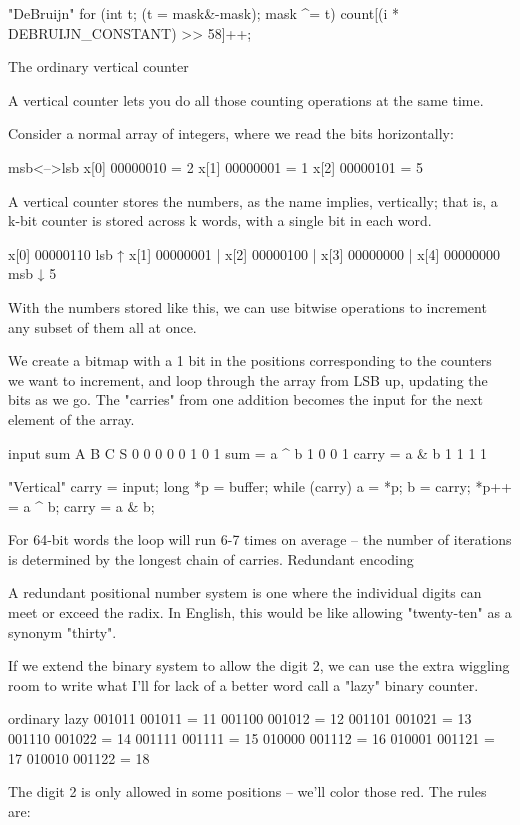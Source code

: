{{{{{{"DeBruijn"
  for (int t; (t = mask&-mask); mask ^= t)
    count[(i * DEBRUIJN_CONSTANT) >> 58]++;

The ordinary vertical counter

A vertical counter lets you do all those counting operations at the same time.

Consider a normal array of integers, where we read the bits horizontally:

       msb<-->lsb
  x[0]  00000010  = 2
  x[1]  00000001  = 1
  x[2]  00000101  = 5

A vertical counter stores the numbers, as the name implies, vertically; that is, a k-bit counter is stored across k words, with a single bit in each word.

  x[0]  00000110   lsb ↑
  x[1]  00000001       |
  x[2]  00000100       |
  x[3]  00000000       |
  x[4]  00000000   msb ↓
             5

With the numbers stored like this, we can use bitwise operations to increment any subset of them all at once.

We create a bitmap with a 1 bit in the positions corresponding to the counters we want to increment, and loop through the array from LSB up, updating the bits as we go. The "carries" from one addition becomes the input for the next element of the array.

  input  sum
   A B   C S
   0 0   0 0
   0 1   0 1      sum    = a ^ b
   1 0   0 1      carry  = a & b
   1 1   1 1

"Vertical"
  carry = input;
  long *p = buffer;
  while (carry) {
    a = *p; b = carry;
    *p++ = a ^ b;
    carry = a & b;
  }

For 64-bit words the loop will run 6-7 times on average -- the number of iterations is determined by the longest chain of carries.
Redundant encoding

A redundant positional number system is one where the individual digits can meet or exceed the radix. In English, this would be like allowing "twenty-ten" as a synonym "thirty".

If we extend the binary system to allow the digit 2, we can use the extra wiggling room to write what I'll for lack of a better word call a "lazy" binary counter.

ordinary    lazy
  001011  001011 = 11
  001100  001012 = 12
  001101  001021 = 13
  001110  001022 = 14
  001111  001111 = 15
  010000  001112 = 16
  010001  001121 = 17
  010010  001122 = 18

The digit 2 is only allowed in some positions -- we'll color those red. The rules are:

}}}}}}
